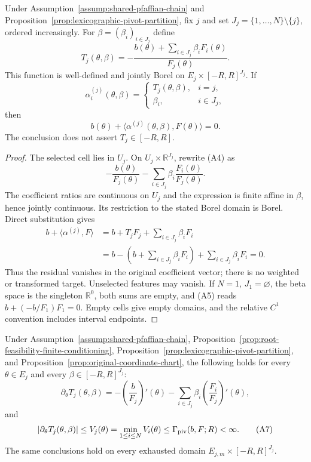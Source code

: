 \begin{proposition}
\label{prop:original-coordinate-chart}
Under Assumption~\ref{assump:shared-pfaffian-chain} and
Proposition~\ref{prop:lexicographic-pivot-partition}, fix $j$ and set
$J_j=\{1,\ldots,N\}\setminus\{j\}$, ordered increasingly.  For
$\beta=(\beta_i)_{i\in J_j}$ define
\[
T_j(\theta,\beta)
=-\frac{b(\theta)+\sum_{i\in J_j}\beta_iF_i(\theta)}{F_j(\theta)}.
\tag{A4}
\]
This function is well-defined and jointly Borel on
$E_j\times[-R,R]^{J_j}$.  If
\[
\alpha_i^{(j)}(\theta,\beta)=
\begin{cases}
T_j(\theta,\beta),&i=j,\\
\beta_i,&i\in J_j,
\end{cases}
\]
then
\[
b(\theta)+\langle\alpha^{(j)}(\theta,\beta),F(\theta)\rangle=0.
\tag{A5}
\]
The conclusion does not assert $T_j\in[-R,R]$.
\end{proposition}

\begin{proof}
The selected cell lies in $U_j$.  On
$U_j\times\mathbb R^{J_j}$, rewrite \textup{(A4)} as
\[
-\frac{b(\theta)}{F_j(\theta)}
-\sum_{i\in J_j}\beta_i\frac{F_i(\theta)}{F_j(\theta)}.
\]
The coefficient ratios are continuous on $U_j$ and the expression is
finite affine in $\beta$, hence jointly continuous.  Its restriction to
the stated Borel domain is Borel.  Direct substitution gives
\[
\begin{aligned}
b+\langle\alpha^{(j)},F\rangle
&=b+T_jF_j+\sum_{i\in J_j}\beta_iF_i\\
&=b-\left(b+\sum_{i\in J_j}\beta_iF_i\right)
 +\sum_{i\in J_j}\beta_iF_i=0.
\end{aligned}
\]
Thus the residual vanishes in the original coefficient vector; there is no
weighted or transformed target.  Unselected features may vanish.  If
$N=1$, $J_1=\varnothing$, the beta space is the singleton
$\mathbb R^0$, both sums are empty, and \textup{(A5)} reads
$b+(-b/F_1)F_1=0$.  Empty cells give empty domains, and the relative $C^1$
convention includes interval endpoints.
\end{proof}

\begin{proposition}
\label{prop:selected-chart-velocity}
Under Assumption~\ref{assump:shared-pfaffian-chain},
Proposition~\ref{prop:root-feasibility-finite-conditioning},
Proposition~\ref{prop:lexicographic-pivot-partition}, and
Proposition~\ref{prop:original-coordinate-chart}, the following holds for
every $\theta\in E_j$ and every $\beta\in[-R,R]^{J_j}$:
\[
\partial_\theta T_j(\theta,\beta)
=-\left(\frac b{F_j}\right)'(\theta)
-\sum_{i\in J_j}\beta_i
 \left(\frac{F_i}{F_j}\right)'(\theta),
\tag{A6}
\]
and
\[
|\partial_\theta T_j(\theta,\beta)|
\leq V_j(\theta)
=\min_{1\leq i\leq N}V_i(\theta)
\leq\Gamma_{\rm piv}(b,F;R)<\infty.
\tag{A7}
\]
The same conclusions hold on every exhausted domain
$E_{j,m}\times[-R,R]^{J_j}$.
\end{proposition}

